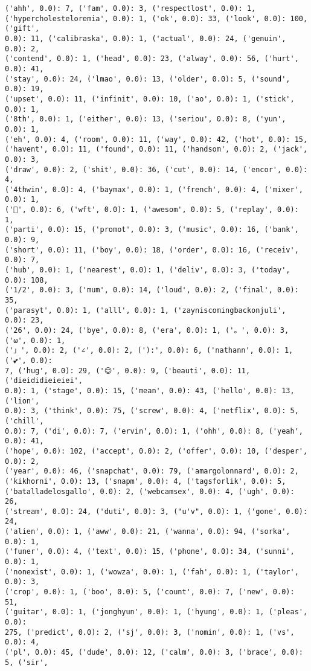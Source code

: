 \documentclass[11pt]{article}
\begin{document}
\begin{Verbatim}[commandchars=\\\{\}]
('ahh', 0.0): 7, ('fam', 0.0): 3, ('respectlost', 0.0): 1,
('hypercholesteloremia', 0.0): 1, ('ok', 0.0): 33, ('look', 0.0): 100, ('gift',
0.0): 11, ('calibraska', 0.0): 1, ('actual', 0.0): 24, ('genuin', 0.0): 2,
('contend', 0.0): 1, ('head', 0.0): 23, ('alway', 0.0): 56, ('hurt', 0.0): 41,
('stay', 0.0): 24, ('lmao', 0.0): 13, ('older', 0.0): 5, ('sound', 0.0): 19,
('upset', 0.0): 11, ('infinit', 0.0): 10, ('ao', 0.0): 1, ('stick', 0.0): 1,
('8th', 0.0): 1, ('either', 0.0): 13, ('seriou', 0.0): 8, ('yun', 0.0): 1,
('eh', 0.0): 4, ('room', 0.0): 11, ('way', 0.0): 42, ('hot', 0.0): 15,
('havent', 0.0): 11, ('found', 0.0): 11, ('handsom', 0.0): 2, ('jack', 0.0): 3,
('draw', 0.0): 2, ('shit', 0.0): 36, ('cut', 0.0): 14, ('encor', 0.0): 4,
('4thwin', 0.0): 4, ('baymax', 0.0): 1, ('french', 0.0): 4, ('mixer', 0.0): 1,
('💜', 0.0): 6, ('wft', 0.0): 1, ('awesom', 0.0): 5, ('replay', 0.0): 1,
('parti', 0.0): 15, ('promot', 0.0): 3, ('music', 0.0): 16, ('bank', 0.0): 9,
('short', 0.0): 11, ('boy', 0.0): 18, ('order', 0.0): 16, ('receiv', 0.0): 7,
('hub', 0.0): 1, ('nearest', 0.0): 1, ('deliv', 0.0): 3, ('today', 0.0): 108,
('1/2', 0.0): 3, ('mum', 0.0): 14, ('loud', 0.0): 2, ('final', 0.0): 35,
('parasyt', 0.0): 1, ('alll', 0.0): 1, ('zayniscomingbackonjuli', 0.0): 23,
('26', 0.0): 24, ('bye', 0.0): 8, ('era', 0.0): 1, ('。', 0.0): 3, ('ω', 0.0): 1,
('」', 0.0): 2, ('∠', 0.0): 2, ('):', 0.0): 6, ('nathann', 0.0): 1, ('💕', 0.0):
7, ('hug', 0.0): 29, ('😊', 0.0): 9, ('beauti', 0.0): 11, ('dieididieieiei',
0.0): 1, ('stage', 0.0): 15, ('mean', 0.0): 43, ('hello', 0.0): 13, ('lion',
0.0): 3, ('think', 0.0): 75, ('screw', 0.0): 4, ('netflix', 0.0): 5, ('chill',
0.0): 7, ('di', 0.0): 7, ('ervin', 0.0): 1, ('ohh', 0.0): 8, ('yeah', 0.0): 41,
('hope', 0.0): 102, ('accept', 0.0): 2, ('offer', 0.0): 10, ('desper', 0.0): 2,
('year', 0.0): 46, ('snapchat', 0.0): 79, ('amargolonnard', 0.0): 2,
('kikhorni', 0.0): 13, ('snapm', 0.0): 4, ('tagsforlik', 0.0): 5,
('batalladelosgallo', 0.0): 2, ('webcamsex', 0.0): 4, ('ugh', 0.0): 26,
('stream', 0.0): 24, ('duti', 0.0): 3, ("u'v", 0.0): 1, ('gone', 0.0): 24,
('alien', 0.0): 1, ('aww', 0.0): 21, ('wanna', 0.0): 94, ('sorka', 0.0): 1,
('funer', 0.0): 4, ('text', 0.0): 15, ('phone', 0.0): 34, ('sunni', 0.0): 1,
('nonexist', 0.0): 1, ('wowza', 0.0): 1, ('fah', 0.0): 1, ('taylor', 0.0): 3,
('crop', 0.0): 1, ('boo', 0.0): 5, ('count', 0.0): 7, ('new', 0.0): 51,
('guitar', 0.0): 1, ('jonghyun', 0.0): 1, ('hyung', 0.0): 1, ('pleas', 0.0):
275, ('predict', 0.0): 2, ('sj', 0.0): 3, ('nomin', 0.0): 1, ('vs', 0.0): 4,
('pl', 0.0): 45, ('dude', 0.0): 12, ('calm', 0.0): 3, ('brace', 0.0): 5, ('sir',

\end{Verbatim}
\end{document}
